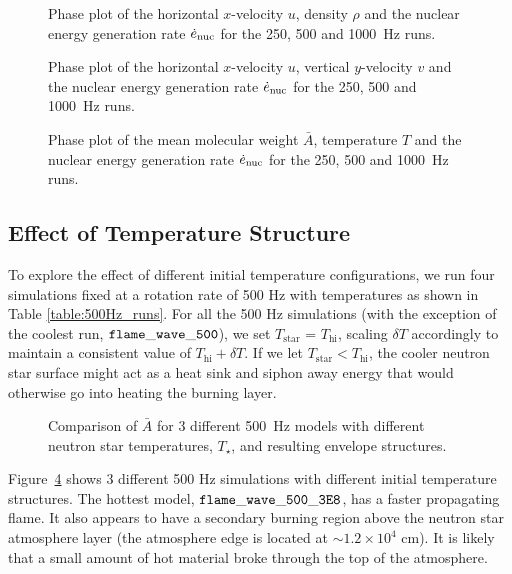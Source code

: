 \documentclass[preprint,times,tighten]{aastex63}
\begin{document}
\begin{figure}[t]
    \centering
    \caption{\label{fig:urho}Phase plot of the horizontal $x$-velocity $u$, density $\rho$ and the nuclear energy generation rate $\dot{e}_{\rm nuc}$ for the 250, 500 and 1000~Hz runs.}
\end{figure}

\begin{figure}[t]
    \centering
    \caption{\label{fig:uv}Phase plot of the horizontal $x$-velocity $u$, vertical $y$-velocity $v$ and the nuclear energy generation rate $\dot{e}_{\rm nuc}$ for the 250, 500 and 1000~Hz runs.}
\end{figure}

\begin{figure}[t]
    \centering
    \caption{\label{fig:abar}Phase plot of the mean molecular weight $\bar{A}$, temperature $T$ and the nuclear energy generation rate $\dot{e}_{\rm nuc}$ for the 250, 500 and 1000~Hz runs.}
\end{figure}
    

\subsection{Effect of Temperature Structure}\label{ssec:temp_structure}

To explore the effect of different initial temperature configurations, we run four simulations fixed at a rotation rate of 500 Hz with temperatures as shown in Table \ref{table:500Hz_runs}. For all the 500 Hz simulations (with the exception of the coolest run, $\tt{flame\_wave\_500}$), we set $T_\mathrm{star}$ = $T_\mathrm{hi}$, scaling $\delta T$ accordingly to maintain a consistent value of $T_\mathrm{hi} + \delta T$. If we let $T_\mathrm{star} < T_\mathrm{hi}$, the cooler neutron star surface might act as a heat sink and siphon away energy that would otherwise go into heating the burning layer.

\begin{figure}[t]
\centering
{}
\caption{\label{fig:compare_500Hz_abar} Comparison of $\bar{A}$ for 3 different 500~Hz models with different neutron star temperatures, $T_\star$, and resulting envelope structures. } %
\end{figure}

Figure~\ref{fig:compare_500Hz_abar} shows 3 different 500 Hz simulations with different initial temperature structures. The hottest model, $\tt{flame\_wave\_500\_3E8}$, has a faster propagating flame. It also appears to have a secondary burning region above the neutron star atmosphere layer (the atmosphere edge is located at $\sim 1.2\times 10^4$ cm). It is likely that a small amount of hot material broke through the top of the atmosphere.
\end{document}
